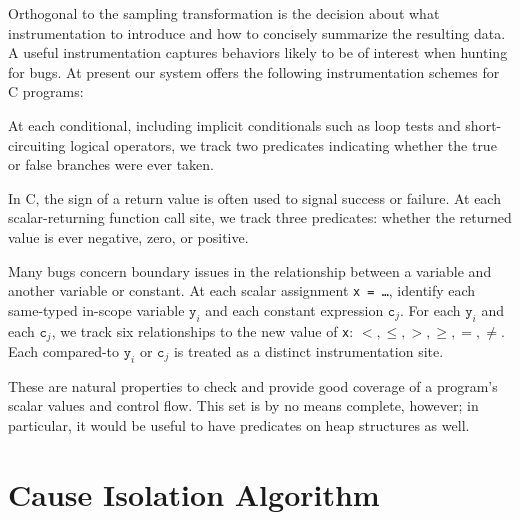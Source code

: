 \documentclass[draft]{sig-alternate}
\begin{document}
Orthogonal to the sampling transformation is the decision about what
instrumentation to introduce and how to concisely summarize the
resulting data.  A useful instrumentation captures behaviors likely to
be of interest when hunting for bugs.  At present our system offers
the following instrumentation schemes for C programs:

\begin{description}
\sloppy
\item[branches:] At each conditional, including implicit conditionals
such as loop tests and short-circuiting logical operators, we track two predicates
indicating whether the true or false branches were ever taken.

\item[returns:] In C, the
  sign of a return value is often used to signal success or failure.
  At each scalar-returning function call site, we track three predicates:
  whether the returned value is ever negative, zero, or positive.  

\item[scalar-pairs:] Many bugs
  concern boundary issues in the relationship between a 
  variable and another variable or constant.  At
  each scalar assignment \texttt{x = \dots}, identify each
  same-typed in-scope variable $\mathtt{y}_i$ and each
  constant expression $\mathtt{c}_j$.  For each   $\mathtt{y}_i$ and each $\mathtt{c}_j$,  
  we track six relationships to the new value of \texttt{x}: $<, \leq, >, \geq, =, \neq$.
Each compared-to $\mathtt{y}_i$
  or $\mathtt{c}_j$ is treated as a distinct instrumentation site.
\end{description}

These are natural properties to check and provide good
coverage of a program's scalar values and control flow.  This set 
is by no means complete, however; in particular, it would be useful
to have predicates on heap structures as well.

\section{Cause Isolation Algorithm}
\label{sec:algorithm}

\end{document}
